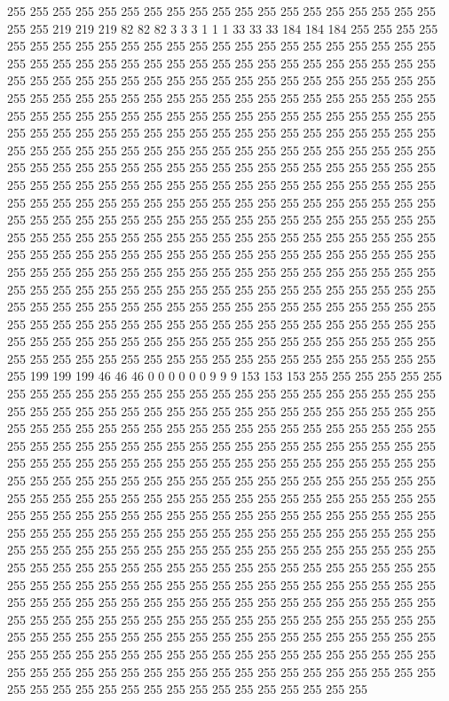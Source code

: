 255 255 255 255 255 255 255 255 255 255 255 255 255 255 255 255 255 255 255 255 255 219 219 219 82 82 82 3 3 3 1 1 1 33 33 33 184 184 184 255 255 255 255 255 255 255 255 255 255 255 255 255 255 255 255 255 255 255 255 255 255 255 255 255 255 255 255 255 255 255 255 255 255 255 255 255 255 255 255 255 255 255 255 255 255 255 255 255 255 255 255 255 255 255 255 255 255 255 255 255 255 255 255 255 255 255 255 255 255 255 255 255 255 255 255 255 255 255 255 255 255 255 255 255 255 255 255 255 
255 255 255 255 255 255 255 255 255 255 255 255 255 255 255 255 255 255 255 255 255 255 255 255 255 255 255 255 255 255 255 255 255 255 255 255 255 255 255 255 255 255 255 255 255 255 255 255 255 255 255 255 255 255 255 255 255 255 255 255 255 255 255 255 255 255 255 255 255 255 255 255 255 255 255 255 255 255 255 255 255 255 255 255 255 255 255 255 255 255 255 255 255 255 255 255 255 255 255 255 255 255 255 255 255 255 255 255 255 255 255 255 255 255 255 255 255 255 255 255 255 255 255 255 255 255 255 255 
255 255 255 255 255 255 255 255 255 255 255 255 255 255 255 255 255 255 255 255 255 255 255 255 255 255 255 255 255 255 255 255 255 255 255 255 255 255 255 255 255 255 255 255 255 255 255 255 255 255 255 255 255 255 255 255 255 255 255 255 255 255 255 255 255 255 255 255 255 255 255 255 255 255 255 255 255 255 255 255 255 255 255 255 255 255 255 255 255 255 255 255 255 255 255 255 255 255 255 255 255 255 255 255 255 255 255 255 255 255 255 255 255 255 255 255 255 255 255 255 255 255 255 255 255 255 255 255 
255 255 255 255 255 255 255 255 255 255 255 255 255 255 255 255 255 255 255 255 255 199 199 199 46 46 46 0 0 0 0 0 0 9 9 9 153 153 153 255 255 255 255 255 255 255 255 255 255 255 255 255 255 255 255 255 255 255 255 255 255 255 255 255 255 255 255 255 255 255 255 255 255 255 255 255 255 255 255 255 255 255 255 255 255 255 255 255 255 255 255 255 255 255 255 255 255 255 255 255 255 255 255 255 255 255 255 255 255 255 255 255 255 255 255 255 255 255 255 255 255 255 255 255 255 255 255 255 
255 255 255 255 255 255 255 255 255 255 255 255 255 255 255 255 255 255 255 255 255 255 255 255 255 255 255 255 255 255 255 255 255 255 255 255 255 255 255 255 255 255 255 255 255 255 255 255 255 255 255 255 255 255 255 255 255 255 255 255 255 255 255 255 255 255 255 255 255 255 255 255 255 255 255 255 255 255 255 255 255 255 255 255 255 255 255 255 255 255 255 255 255 255 255 255 255 255 255 255 255 255 255 255 255 255 255 255 255 255 255 255 255 255 255 255 255 255 255 255 255 255 255 255 255 255 255 255 
255 255 255 255 255 255 255 255 255 255 255 255 255 255 255 255 255 255 255 255 255 255 255 255 255 255 255 255 255 255 255 255 255 255 255 255 255 255 255 255 255 255 255 255 255 255 255 255 255 255 255 255 255 255 255 255 255 255 255 255 255 255 255 255 255 255 255 255 255 255 255 255 255 255 255 255 255 255 255 255 255 255 255 255 255 255 255 255 255 255 255 255 255 255 255 255 255 255 255 255 255 255 255 255 255 255 255 255 255 255 255 255 255 255 255 255 255 255 255 255 255 255 255 255 255 255 255 255 
